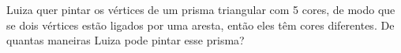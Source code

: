 Luiza quer pintar os vértices de um prisma triangular com 5 cores, de modo que se dois vértices estão ligados por uma aresta, então eles têm cores diferentes.
De quantas maneiras Luiza pode pintar esse prisma?
